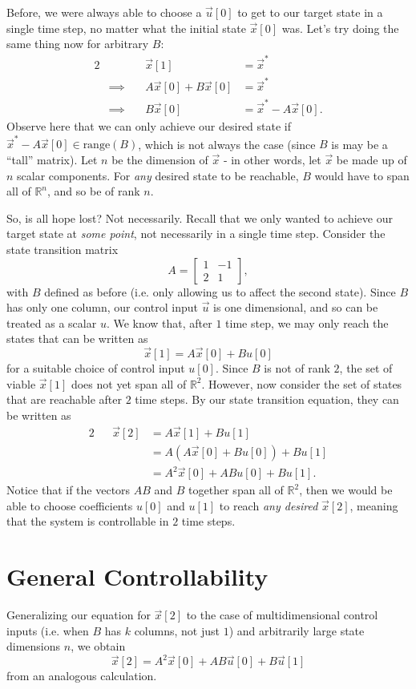 \documentclass[letterpaper]{article}
\theoremstyle{remark}
\newcommand{\mat}[1]{\ensuremath{\begin{bmatrix}#1\end{bmatrix}}}
\newcommand{\eqn}[1]{\begin{alignat*}{2}#1\end{alignat*}}
\newcommand*{\thus}{&\implies\quad&}
\begin{document}
Before, we were always able to choose a $\vec{u}[0]$ to get to our target state in a single time step, no matter what the initial state $\vec{x}[0]$ was. Let's try doing the same thing now for arbitrary $B$:
\eqn{
    && \vec{x}[1] &= \vec{x}^* \\
    \thus A\vec{x}[0] + B\vec{x}[0] &= \vec{x}^* \\
    \thus B\vec{x}[0] &= \vec{x}^* - A\vec{x}[0].
}
Observe here that we can only achieve our desired state if $\vec{x}^* - A\vec{x}[0] \in \text{range}(B)$, which is not always the case (since $B$ is may be a ``tall'' matrix). Let $n$ be the dimension of $\vec{x}$ - in other words, let $\vec{x}$ be made up of $n$ scalar components. For \emph{any} desired state to be reachable, $B$ would have to span all of $\mathbb{R}^n$, and so be of rank $n$.

So, is all hope lost? Not necessarily. Recall that we only wanted to achieve our target state at \emph{some point}, not necessarily in a single time step. Consider the state transition matrix
\[
    A = \mat{1 & -1 \\ 2 & 1},
\]
with $B$ defined as before (i.e. only allowing us to affect the second state). Since $B$ has only one column, our control input $\vec{u}$ is one dimensional, and so can be treated as a scalar $u$. We know that, after $1$ time step, we may only reach the states that can be written as
\[
    \vec{x}[1] = A\vec{x}[0] + Bu[0]
\]
for a suitable choice of control input $u[0]$. Since $B$ is not of rank $2$, the set of viable $\vec{x}[1]$ does not yet span all of $\mathbb{R}^2$. However, now consider the set of states that are reachable after $2$ time steps. By our state transition equation, they can be written as
\eqn{
    && \vec{x}[2] &= A\vec{x}[1] + Bu[1] \\
    &&&= A(A\vec{x}[0] + Bu[0]) + Bu[1] \\
    &&&= A^2\vec{x}[0] + ABu[0] + Bu[1].
}
Notice that if the vectors $AB$ and $B$ together span all of $\mathbb{R}^2$, then we would be able to choose coefficients $u[0]$ and $u[1]$ to reach \emph{any desired} $\vec{x}[2]$, meaning that the system is controllable in $2$ time steps.

\section{General Controllability}
Generalizing our equation for $\vec{x}[2]$ to the case of multidimensional control inputs (i.e. when $B$ has $k$ columns, not just $1$) and arbitrarily large state dimensions $n$, we obtain
\[
    \vec{x}[2] = A^2\vec{x}[0] + AB\vec{u}[0] + B\vec{u}[1]
\]
from an analogous calculation.
\end{document}
